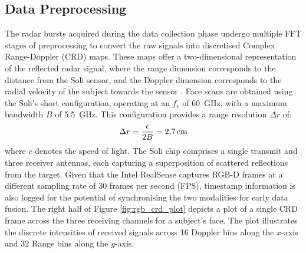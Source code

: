\documentclass{mpaper}
\begin{document}
\subsection{Data Preprocessing}
The radar bursts acquired during the data collection phase undergo multiple FFT stages of preprocessing to convert the raw signals into discretised Complex Range-Doppler (CRD) maps. These maps offer a two-dimensional representation of the reflected radar signal, where the range dimension corresponds to the distance from the Soli sensor, and the Doppler dimension corresponds to the radial velocity of the subject towards the sensor \cite{lien2016soli,hayashi2021radarnet}. Face scans are obtained using the Soli's short configuration, operating at an $f_c$ of \qty{60}{\GHz}, with a maximum bandwidth $B$ of \qty{5.5}{\GHz}. This configuration provides a range resolution $\Delta r$ of:
$$\Delta r = \frac{c}{2B} = \text{\qty{2.7}{\cm}}$$
where $c$ denotes the speed of light. The Soli chip comprises a single transmit and three receiver antennas, each capturing a superposition of scattered reflections from the target. Given that the Intel RealSense captures RGB-D frames at a different sampling rate of 30 frames per second (FPS), timestamp information is also logged for the potential of synchronising the two modalities for early data fusion. The right half of Figure \ref{fig:rgb_crd_plot} depicts a plot of a single CRD frame across the three receiving channels for a subject's face. The plot illustrates the discrete intensities of received signals across 16 Doppler bins along the $x$-axis and 32 Range bins along the $y$-axis.
\end{document}
